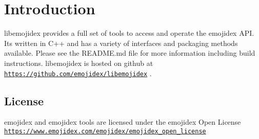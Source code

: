 \hypertarget{index_intro_sec}{}\section{Introduction}\label{index_intro_sec}
libemojidex provides a full set of tools to access and operate the emojidex A\+PI. It\textquotesingle{}s written in C++ and has a variety of interfaces and packaging methods available. Please see the R\+E\+A\+D\+M\+E.\+md file for more information including build instructions. libemojidex is hosted on github at \href{https://github.com/emojidex/libemojidex}{\tt https\+://github.\+com/emojidex/libemojidex} .\hypertarget{index_License}{}\subsection{License}\label{index_License}
emojidex and emojidex tools are licensed under the emojidex Open License \href{https://www.emojidex.com/emojidex/emojidex_open_license}{\tt https\+://www.\+emojidex.\+com/emojidex/emojidex\+\_\+open\+\_\+license} 